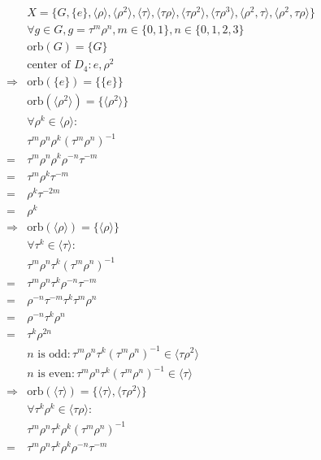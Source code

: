 \documentclass{article}
\begin{document}
\begin{equation*}
    \begin{split}
        &X=\{G,\{e\},\langle\rho\rangle,\langle\rho^2\rangle,\langle\tau\rangle,\langle\tau\rho\rangle,\langle\tau\rho^2\rangle,\langle\tau\rho^3\rangle,\langle\rho^2,\tau\rangle,\langle\rho^2,\tau\rho\rangle\}\\
        &\forall g\in G,g=\tau^m\rho^n,m\in\{0,1\},n\in\{0,1,2,3\}\\
        &\text{orb}(G)=\{G\}\\
        &\text{center of }D_4:e,\rho^2\\
        \Rightarrow&\text{orb}(\{e\})=\{\{e\}\}\\
        &\text{orb}(\langle\rho^2\rangle)=\{\langle\rho^2\rangle\}\\
        &\forall \rho^k\in\langle\rho\rangle:\\
        &\tau^m\rho^n\rho^k(\tau^m\rho^n)^{-1}\\
        =&\tau^m\rho^n\rho^k\rho^{-n}\tau^{-m}\\
        =&\tau^m\rho^k\tau^{-m}\\
        =&\rho^k\tau^{-2m}\\
        =&\rho^k\\
        \Rightarrow&\text{orb}(\langle\rho\rangle)=\{\langle\rho\rangle\}\\
        &\forall \tau^k\in\langle\tau\rangle:\\
        &\tau^m\rho^n\tau^k(\tau^m\rho^n)^{-1}\\
        =&\tau^m\rho^n\tau^k\rho^{-n}\tau^{-m}\\
        =&\rho^{-n}\tau^{-m}\tau^k\tau^m\rho^n\\
        =&\rho^{-n}\tau^k\rho^n\\
        =&\tau^k\rho^{2n}\\
        &n\text{ is odd}:\tau^m\rho^n\tau^k(\tau^m\rho^n)^{-1}\in\langle\tau\rho^2\rangle\\
        &n\text{ is even}:\tau^m\rho^n\tau^k(\tau^m\rho^n)^{-1}\in\langle\tau\rangle\\
        \Rightarrow&\text{orb}(\langle\tau\rangle)=\{\langle\tau\rangle,\langle\tau\rho^2\rangle\}\\
        &\forall \tau^k\rho^k\in\langle\tau\rho\rangle:\\
        &\tau^m\rho^n \tau^k\rho^k(\tau^m\rho^n)^{-1}\\
        =&\tau^m\rho^n \tau^k\rho^k\rho^{-n}\tau^{-m}\\

\end{split}
\end{equation*}
\end{document}
